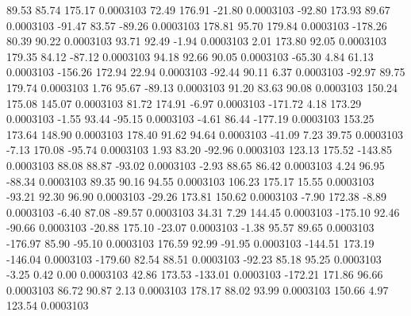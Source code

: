        89.53       85.74      175.17     0.0003103
       72.49      176.91      -21.80     0.0003103
      -92.80      173.93       89.67     0.0003103
      -91.47       83.57      -89.26     0.0003103
      178.81       95.70      179.84     0.0003103
     -178.26       80.39       90.22     0.0003103
       93.71       92.49       -1.94     0.0003103
        2.01      173.80       92.05     0.0003103
      179.35       84.12      -87.12     0.0003103
       94.18       92.66       90.05     0.0003103
      -65.30        4.84       61.13     0.0003103
     -156.26      172.94       22.94     0.0003103
      -92.44       90.11        6.37     0.0003103
      -92.97       89.75      179.74     0.0003103
        1.76       95.67      -89.13     0.0003103
       91.20       83.63       90.08     0.0003103
      150.24      175.08      145.07     0.0003103
       81.72      174.91       -6.97     0.0003103
     -171.72        4.18      173.29     0.0003103
       -1.55       93.44      -95.15     0.0003103
       -4.61       86.44     -177.19     0.0003103
      153.25      173.64      148.90     0.0003103
      178.40       91.62       94.64     0.0003103
      -41.09        7.23       39.75     0.0003103
       -7.13      170.08      -95.74     0.0003103
        1.93       83.20      -92.96     0.0003103
      123.13      175.52     -143.85     0.0003103
       88.08       88.87      -93.02     0.0003103
       -2.93       88.65       86.42     0.0003103
        4.24       96.95      -88.34     0.0003103
       89.35       90.16       94.55     0.0003103
      106.23      175.17       15.55     0.0003103
      -93.21       92.30       96.90     0.0003103
      -29.26      173.81      150.62     0.0003103
       -7.90      172.38       -8.89     0.0003103
       -6.40       87.08      -89.57     0.0003103
       34.31        7.29      144.45     0.0003103
     -175.10       92.46      -90.66     0.0003103
      -20.88      175.10      -23.07     0.0003103
       -1.38       95.57       89.65     0.0003103
     -176.97       85.90      -95.10     0.0003103
      176.59       92.99      -91.95     0.0003103
     -144.51      173.19     -146.04     0.0003103
     -179.60       82.54       88.51     0.0003103
      -92.23       85.18       95.25     0.0003103
       -3.25        0.42        0.00     0.0003103
       42.86      173.53     -133.01     0.0003103
     -172.21      171.86       96.66     0.0003103
       86.72       90.87        2.13     0.0003103
      178.17       88.02       93.99     0.0003103
      150.66        4.97      123.54     0.0003103
